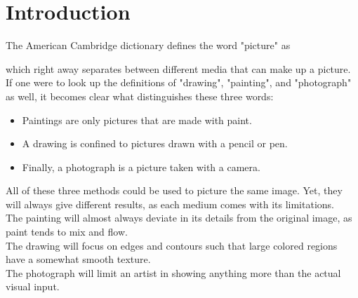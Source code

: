 \chapter{Introduction}



The American Cambridge dictionary defines the word "picture" as
    
 
which right away separates between different media that can make up a picture.
If one were to look up the definitions of "drawing", "painting", and "photograph" as well, it becomes clear what distinguishes these three words:
\begin{itemize}
\item Paintings are only pictures that are made with paint.
\item A drawing is confined to pictures drawn with a pencil or pen.
\item Finally, a photograph is a picture taken with a camera.
\end{itemize}

All of these three methods could be used to picture the same image.
Yet, they will always give different results, as each medium comes with its limitations.\\
The painting will almost always deviate in its details from the original image, as paint tends to mix and flow.\\
The drawing will focus on edges and contours such that large colored regions have a somewhat smooth texture.\\
The photograph will limit an artist in showing anything more than the actual visual input.\\

